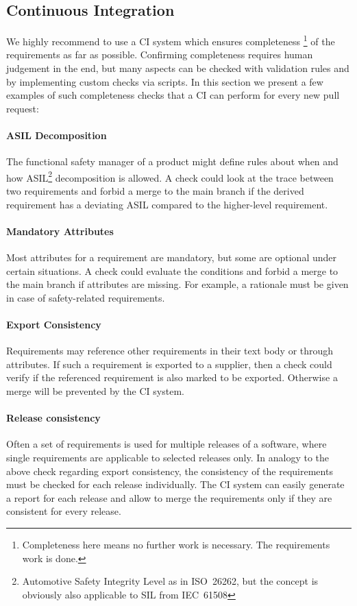 \documentclass[english]{lni}
\begin{document}
\subsection{Continuous Integration}
\label{continuous_integration}
We highly recommend to use a CI system which ensures completeness%
\footnote{Completeness here means no further work is necessary.  The
  requirements work is done.}  of the requirements as far as possible.
Confirming completeness requires human judgement in the end, but many
aspects can be checked with validation rules and by implementing
custom checks via scripts. In this section we present a few examples
of such completeness checks that a CI can perform for every new pull
request:

\paragraph{ASIL Decomposition}
The functional safety manager of a product might define rules about
when and how ASIL\footnote{Automotive Safety Integrity Level as in
  ISO~26262, but the concept is obviously also applicable to SIL from
  IEC~61508} decomposition is allowed.  A check could look at the
trace between two requirements and forbid a merge to the main branch
if the derived requirement has a deviating ASIL compared to the
higher-level requirement.

\paragraph{Mandatory Attributes}
Most attributes for a requirement are mandatory, but some are optional
under certain situations.  A check could evaluate the conditions and
forbid a merge to the main branch if attributes are missing.  For
example, a rationale must be given in case of safety-related
requirements.

\paragraph{Export Consistency}
Requirements may reference other requirements in their text body or
through attributes.  If such a requirement is exported to a supplier,
then a check could verify if the referenced requirement is also marked
to be exported.  Otherwise a merge will be prevented by the CI system.

\paragraph{Release consistency}
Often a set of requirements is used for multiple releases of a
software, where single requirements are applicable to selected
releases only.  In analogy to the above check regarding export
consistency, the consistency of the requirements must be checked for
each release individually.  The CI system can easily generate a report
for each release and allow to merge the requirements only if they are
consistent for every release.
\end{document}
